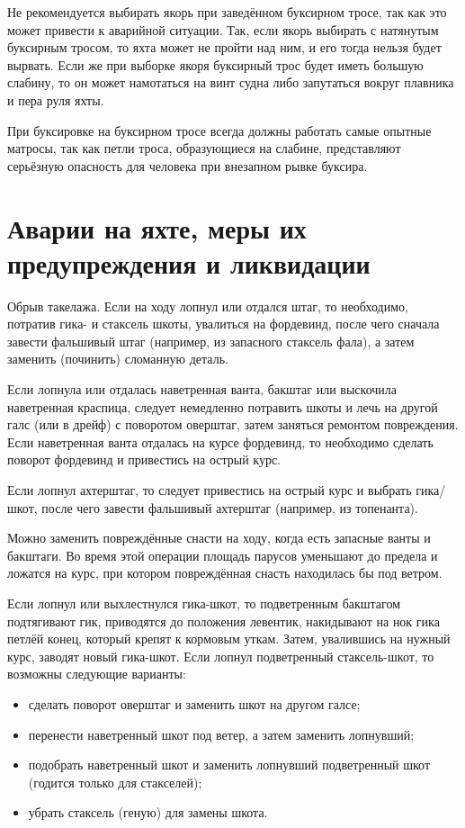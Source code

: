 Не рекомендуется выбирать якорь при заведённом буксирном тросе, так как это может привести к аварийной ситуации. Так, если якорь выбирать с натянутым буксирным тросом, то яхта может не пройти над ним, и его тогда нельзя будет вырвать. Если же при выборке якоря буксирный трос будет иметь большую слабину, то он может намотаться на винт судна либо запутаться вокруг плавника и пера руля яхты.

При буксировке на буксирном тросе всегда должны работать самые опытные матросы, так как петли троса, образующиеся на слабине, представляют серьёзную опасность для человека при внезапном рывке буксира. 

\section{Аварии на яхте, меры их предупреждения и ликвидации}

Обрыв такелажа. Если на ходу лопнул или отдался штаг, то необходимо, потратив гика- и стаксель шкоты, увалиться на фордевинд, после чего сначала завести фальшивый штаг (например, из запасного стаксель фала), а затем заменить (починить) сломанную деталь.

Если лопнула или отдалась наветренная ванта, бакштаг или выскочила наветренная краспица, следует немедленно потравить шкоты и лечь на другой галс (или в дрейф) с поворотом оверштаг, затем заняться ремонтом повреждения. Если наветренная ванта отдалась на курсе фордевинд, то необходимо сделать поворот фордевинд и привестись на острый курс.

Если лопнул ахтерштаг, то следует привестись на острый курс и выбрать гика\-/шкот, после чего завести фальшивый ахтерштаг (например, из топенанта).

Можно заменить повреждённые снасти на ходу, когда есть запасные ванты и бакштаги. Во время этой операции площадь парусов уменьшают до предела и ложатся на курс, при котором повреждённая снасть находилась бы под ветром.

Если лопнул или выхлестнулся гика-шкот, то подветренным бакштагом подтягивают гик, приводятся до положения левентик, накидывают на нок гика петлёй конец, который крепят к кормовым уткам. Затем, увалившись на нужный курс, заводят новый гика-шкот.
Если лопнул подветренный стаксель-шкот, то возможны следующие варианты: 
\begin{itemize}
\item сделать поворот оверштаг и заменить шкот на другом галсе; 
\item перенести наветренный шкот под ветер, а затем заменить лопнувший; 
\item подобрать наветренный шкот и заменить лопнувший подветренный шкот (годится только для стакселей); 
\item убрать стаксель (геную) для замены шкота. 
\end{itemize}

